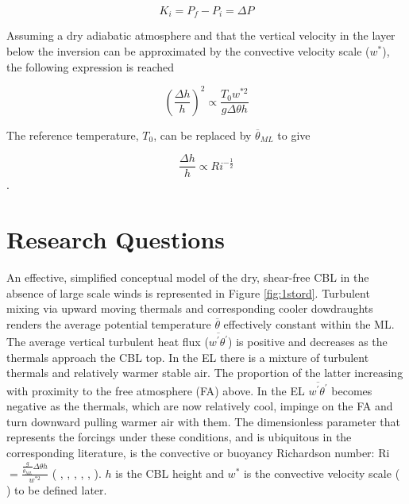 \begin{equation}
K_{i} = P_{f} - P_{i} = \Delta P
\end{equation}

Assuming a dry adiabatic atmosphere and that the vertical velocity in the layer below the inversion can be approximated by the convective velocity scale ($w^{*}$), the following expression is reached

\begin{equation}
\left(\frac{\Delta h}{h}\right)^{2} \propto \frac{T_{0} w^{*2}}{g \Delta \theta h}
\end{equation}

The reference temperature, $T_{0}$, can be replaced by $\overline{\theta}_{ML}$ to give

\begin{equation}
\frac{\Delta h}{h} \propto Ri^{-\frac{1}{2}}
\end{equation}.



\section{Research Questions}
\label{sec:resquest}

An effective, simplified conceptual model of the dry, shear-free \acs{CBL} in the absence of large scale winds is represented in Figure \ref{fig:1stord}.  Turbulent mixing via upward moving thermals and corresponding cooler dowdraughts renders the average potential temperature $\overline{\theta}$ effectively constant within the \acs{ML}.  The average vertical turbulent heat flux ($\overline{w^{'}\theta^{'}}$) is positive and decreases as the thermals approach the \acs{CBL} top.  In the \acs{EL} there is a mixture of turbulent thermals and relatively warmer stable air.  The proportion of the latter increasing with proximity to the free atmosphere (\acs{FA}) above.  In the \acs{EL} $\overline{w^{'}\theta^{'}}$ becomes negative as the thermals, which are now relatively cool, impinge on the \acs{FA} and turn downward pulling warmer air with them.  The dimensionless parameter that represents the forcings under these conditions, and is ubiquitous in the corresponding literature, is the convective or buoyancy Richardson number: \acs{Ri} $=\frac{\frac{g}{\overline{\theta}_{ML}}\Delta \theta h}{w^{*2}}$ ( \citeauthor{DearWill80} \citeyear{DearWill80}, \citeauthor{Stull-BLMetIntro} \citeyear{Stull-BLMetIntro}, \citeauthor{SullMoengStev} \citeyear{SullMoengStev}, \citeauthor{FedConzMir04} \citeyear{FedConzMir04}, \citeauthor{BrooksFowler2} \citeyear{BrooksFowler2}, \citeauthor{GarciaMellado} \citeyear{GarciaMellado}).  $h$ is the \acs{CBL} height and $w^{*}$ is the convective velocity scale (\citeauthor{Deardorff70} \citeyear{Deardorff70}) to be defined later.\\   


